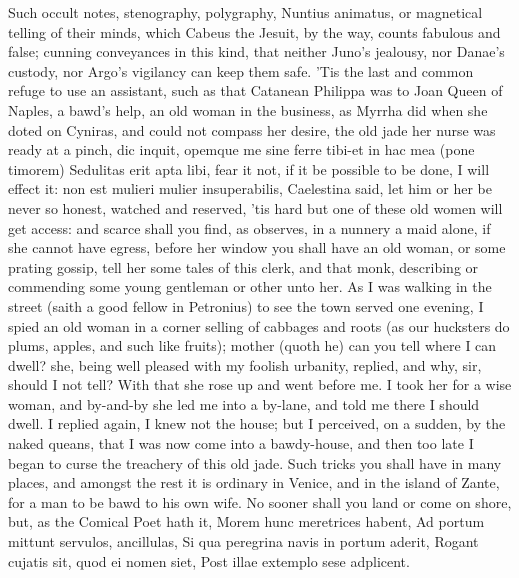 Such occult notes, stenography, polygraphy, Nuntius animatus, or
magnetical telling of their minds, which Cabeus the Jesuit, by
the way, counts fabulous and false; cunning conveyances in this kind,
that neither Juno's jealousy, nor Danae's custody, nor Argo's vigilancy
can keep them safe. 'Tis the last and common refuge to use an
assistant, such as that Catanean Philippa was to Joan Queen of Naples,
a bawd's help, an old woman in the business, as Myrrha did
when she doted on Cyniras, and could not compass her desire, the old
jade her nurse was ready at a pinch, dic inquit, opemque me sine ferre
tibi-et in hac mea (pone timorem) Sedulitas erit apta libi, fear it
not, if it be possible to be done, I will effect it: non est mulieri
mulier insuperabilis, Caelestina said, let him or her be never so
honest, watched and reserved, 'tis hard but one of these old women will
get access: and scarce shall you find, as \Austin{} observes, in a
nunnery a maid alone, if she cannot have egress, before her window you
shall have an old woman, or some prating gossip, tell her some tales of
this clerk, and that monk, describing or commending some young
gentleman or other unto her. As I was walking in the street (saith a
good fellow in Petronius) to see the town served one evening, I
spied an old woman in a corner selling of cabbages and roots (as our
hucksters do plums, apples, and such like fruits); mother (quoth he)
can you tell where I can dwell? she, being well pleased with my foolish
urbanity, replied, and why, sir, should I not tell? With that she rose
up and went before me. I took her for a wise woman, and by-and-by she
led me into a by-lane, and told me there I should dwell. I replied
again, I knew not the house; but I perceived, on a sudden, by the naked
queans, that I was now come into a bawdy-house, and then too late I
began to curse the treachery of this old jade. Such tricks you shall
have in many places, and amongst the rest it is ordinary in Venice, and
in the island of Zante, for a man to be bawd to his own wife. No sooner
shall you land or come on shore, but, as the Comical Poet hath it,
Morem hunc meretrices habent,
Ad portum mittunt servulos, ancillulas,
Si qua peregrina navis in portum aderit,
Rogant cujatis sit, quod ei nomen siet,
Post illae extemplo sese adplicent.

